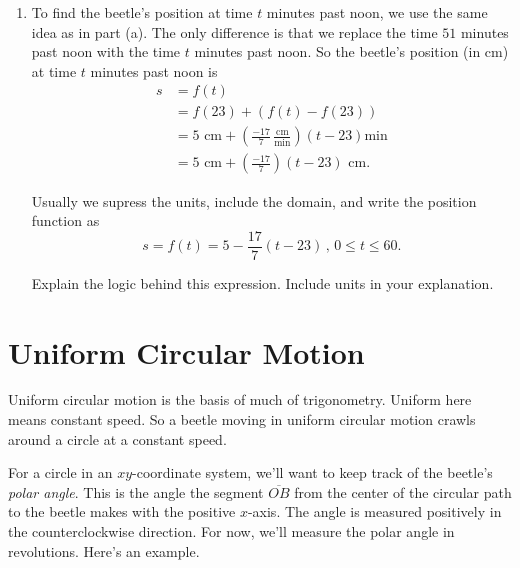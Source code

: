 \documentclass{ximera}
\begin{document}
\begin{example}
\begin{explanation}
\begin{enumerate}
\item To find the beetle's position at time $t$ minutes past noon, we use the same idea as in part (a). The only difference is that we replace the time $51$ minutes past noon with the time $t$ minutes past noon. So the beetle's position (in cm) at time $t$ minutes past noon is
\begin{align*}
     s &= f(t) \\
        &= f(23) + (f(t) -  f(23)) \\
        &=  5 \text{ cm} + \left(  \frac{-17}{7} \, \frac{\text{cm}}{\text{min}} \right) \left( t - 23 \right) \text{min} \\
        &=  5 \text{ cm} + \left(  \frac{-17}{7} \right) \left(t - 23 \right) \text{ cm} .
\end{align*}

Usually we supress the units, include the domain, and write the position function as
\[
    s = f(t) =  5 - \frac{17}{7}\left(t - 23  \right) \, , \, 0\leq t \leq 60.
\]

Explain the logic behind this expression. Include units in your explanation.
\begin{freeResponse}
\end{freeResponse}

\end{enumerate}
\end{explanation}

\end{example}

\section{Uniform Circular Motion}

Uniform circular motion is the basis of much of trigonometry. Uniform here means constant speed. So a beetle moving in uniform circular motion crawls around a circle at a constant speed.

For a circle in an $xy$-coordinate system, we'll want to keep track of the beetle's \emph{polar angle}. This is the angle the segment $\overline{OB}$ from the center of the circular path to the beetle makes with the positive $x$-axis. The angle is measured positively in the counterclockwise direction. For now, we'll measure the polar angle in revolutions. Here's an example.
\end{document}
